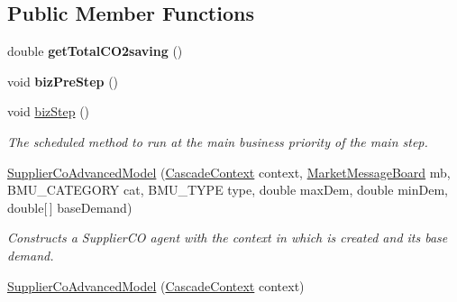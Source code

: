 \subsection*{Public Member Functions}
\begin{DoxyCompactItemize}
\item 
\hypertarget{classuk_1_1ac_1_1dmu_1_1iesd_1_1cascade_1_1agents_1_1aggregators_1_1_supplier_co_advanced_model_a7af4f0d6ae9d62a4fd893ed15ce0f86d}{double {\bfseries get\-Total\-C\-O2saving} ()}\label{classuk_1_1ac_1_1dmu_1_1iesd_1_1cascade_1_1agents_1_1aggregators_1_1_supplier_co_advanced_model_a7af4f0d6ae9d62a4fd893ed15ce0f86d}

\item 
\hypertarget{classuk_1_1ac_1_1dmu_1_1iesd_1_1cascade_1_1agents_1_1aggregators_1_1_supplier_co_advanced_model_a06a8f5fd0419d00cdd26384527ad0290}{void {\bfseries biz\-Pre\-Step} ()}\label{classuk_1_1ac_1_1dmu_1_1iesd_1_1cascade_1_1agents_1_1aggregators_1_1_supplier_co_advanced_model_a06a8f5fd0419d00cdd26384527ad0290}

\item 
void \hyperlink{classuk_1_1ac_1_1dmu_1_1iesd_1_1cascade_1_1agents_1_1aggregators_1_1_supplier_co_advanced_model_a94251d856ad9615a52c297b92d4703dd}{biz\-Step} ()
\begin{DoxyCompactList}\small\item\em The scheduled method to run at the main business priority of the main step. \end{DoxyCompactList}\item 
\hyperlink{classuk_1_1ac_1_1dmu_1_1iesd_1_1cascade_1_1agents_1_1aggregators_1_1_supplier_co_advanced_model_aba70f0a59f41e4ba22fa2585a8123514}{Supplier\-Co\-Advanced\-Model} (\hyperlink{classuk_1_1ac_1_1dmu_1_1iesd_1_1cascade_1_1context_1_1_cascade_context}{Cascade\-Context} context, \hyperlink{classuk_1_1ac_1_1dmu_1_1iesd_1_1cascade_1_1market_1_1astem_1_1operators_1_1_market_message_board}{Market\-Message\-Board} mb, B\-M\-U\-\_\-\-C\-A\-T\-E\-G\-O\-R\-Y cat, B\-M\-U\-\_\-\-T\-Y\-P\-E type, double max\-Dem, double min\-Dem, double\mbox{[}$\,$\mbox{]} base\-Demand)
\begin{DoxyCompactList}\small\item\em Constructs a Supplier\-C\-O agent with the context in which is created and its base demand. \end{DoxyCompactList}\item 
\hyperlink{classuk_1_1ac_1_1dmu_1_1iesd_1_1cascade_1_1agents_1_1aggregators_1_1_supplier_co_advanced_model_a0a5e5ee87de492f07d6a0a4c437f6372}{Supplier\-Co\-Advanced\-Model} (\hyperlink{classuk_1_1ac_1_1dmu_1_1iesd_1_1cascade_1_1context_1_1_cascade_context}{Cascade\-Context} context)
\end{DoxyCompactItemize}
